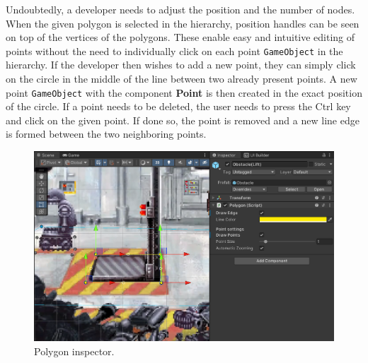 Undoubtedly, a developer needs to adjust the position and the number of nodes. When the given polygon is selected in the hierarchy, position handles can be seen on top of the vertices of the polygons. These enable easy and intuitive editing of points without the need to individually click on each point \verb|GameObject| in the hierarchy. If the developer then wishes to add a new point, they can simply click on the circle in the middle of the line between two already present points. A new point \verb|GameObject| with the component \textbf{Point} is then created in the exact position of the circle. If a point needs to be deleted, the user needs to press the Ctrl key and click on the given point. If done so, the point is removed and a new line edge is formed between the two neighboring points.
\begin{figure}[H]
\centering
\includegraphics[width=1\linewidth]{img/User doc/polygon.png}
\caption{Polygon inspector.}
\label{fig:Manual-Polygon}
\end{figure}

